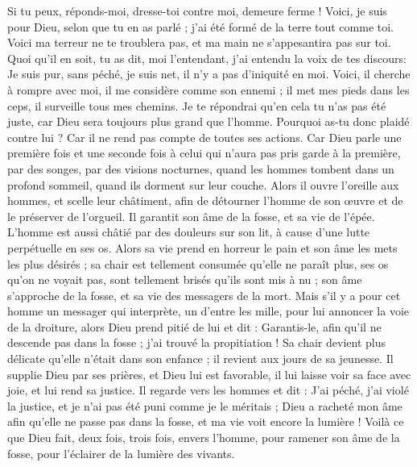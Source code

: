 \begin{multicols}{2}
Si tu peux, réponds-moi, dresse-toi contre moi, demeure ferme !
Voici, je suis pour Dieu, selon que tu en as parlé ; j'ai été formé de la terre tout comme toi.
Voici ma terreur ne te troublera pas, et ma main ne s'appesantira pas sur toi.
Quoi qu'il en soit, tu as dit, moi l'entendant, j'ai entendu la voix de tes discours:
Je suis pur, sans péché, je suis net, il n'y a pas d'iniquité en moi.
Voici, il cherche à rompre avec moi, il me considère comme son ennemi ;
il met mes pieds dans les ceps, il surveille tous mes chemins.
Je te répondrai qu'en cela tu n'as pas été juste, car Dieu sera toujours plus grand que l'homme.
Pourquoi as-tu donc plaidé contre lui ? Car il ne rend pas compte de toutes ses actions.
Car Dieu parle une première fois et une seconde fois à celui qui n'aura pas pris garde à la première,
par des songes, par des visions nocturnes, quand les hommes tombent dans un profond sommeil, quand ils dorment sur leur couche.
Alors il ouvre l'oreille aux hommes, et scelle leur châtiment,
afin de détourner l'homme de son œuvre et de le préserver de l'orgueil.
Il garantit son âme de la fosse, et sa vie de l'épée.
L'homme est aussi châtié par des douleurs sur son lit, à cause d'une lutte perpétuelle en ses os.
Alors sa vie prend en horreur le pain et son âme les mets les plus désirés ;
sa chair est tellement consumée qu'elle ne paraît plus, ses os qu'on ne voyait pas, sont tellement brisés qu'ils sont mis à nu ;
son âme s'approche de la fosse, et sa vie des messagers de la mort.
Mais s'il y a pour cet homme un messager qui interprète, un d'entre les mille, pour lui annoncer la voie de la droiture,
alors Dieu prend pitié de lui et dit : Garantis-le, afin qu'il ne descende pas dans la fosse ; j'ai trouvé la propitiation !
Sa chair devient plus délicate qu'elle n'était dans son enfance ; il revient aux jours de sa jeunesse.
Il supplie Dieu par ses prières, et Dieu lui est favorable, il lui laisse voir sa face avec joie, et lui rend sa justice.
Il regarde vers les hommes et dit : J'ai péché, j'ai violé la justice, et je n'ai pas été puni comme je le méritais ;
Dieu a racheté mon âme afin qu'elle ne passe pas dans la fosse, et ma vie voit encore la lumière !
Voilà ce que Dieu fait, deux fois, trois fois, envers l'homme,
pour ramener son âme de la fosse, pour l'éclairer de la lumière des vivants.

\end{multicols}
